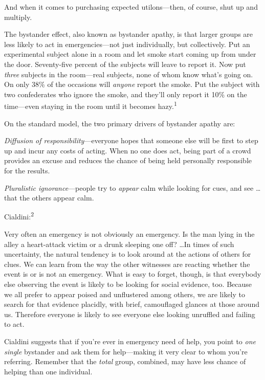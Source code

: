 {
 And when it comes to purchasing expected utilons---then, of
course, shut up and multiply.}

\myendsectiontext


{
 The bystander effect, also known as bystander apathy, is that
larger groups are less likely to act in emergencies---not just
individually, but collectively. Put an experimental subject alone in a
room and let smoke start coming up from under the door. Seventy-five
percent of the subjects will leave to report it. Now put \textit{three}
subjects in the room---real subjects, none of whom know
what's going on. On only 38\% of the occasions will
\textit{anyone} report the smoke. Put the subject with two confederates
who ignore the smoke, and they'll only report it 10\%
on the time---even staying in the room until it becomes
hazy.\textsuperscript{1} }

{
 On the standard model, the two primary drivers of bystander apathy
are:}

{
 \textit{Diffusion of responsibility}{}---everyone hopes that
someone else will be first to step up and incur any costs of acting.
When no one does act, being part of a crowd provides an excuse and
reduces the chance of being held personally responsible for the
results.}

{
 \textit{Pluralistic ignorance}{}---people try to \textit{appear}
calm while looking for cues, and see \ldots that the others appear
calm.}

{
 Cialdini:\textsuperscript{2}}

{
 Very often an emergency is not obviously an emergency. Is the man
lying in the alley a heart-attack victim or a drunk sleeping one off?
\ldots In times of such uncertainty, the natural tendency is to look
around at the actions of others for clues. We can learn from the way
the other witnesses are reacting whether the event is or is not an
emergency. What is easy to forget, though, is that everybody else
observing the event is likely to be looking for social evidence, too.
Because we all prefer to appear poised and unflustered among others, we
are likely to search for that evidence placidly, with brief,
camouflaged glances at those around us. Therefore everyone is likely to
see everyone else looking unruffled and failing to act.}

{
 Cialdini suggests that if you're ever in emergency
need of help, you point to \textit{one single} bystander and ask them
for help---making it very clear to whom you're
referring. Remember that the \textit{total} group, combined, may have
less chance of helping than one individual.}

